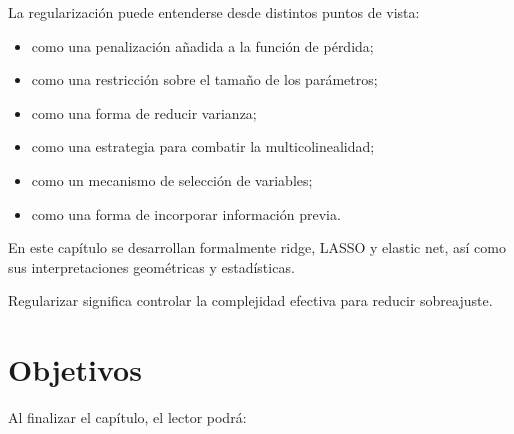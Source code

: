 \documentclass[
  spanish,
  10.5pt,
  letterpaper,
  DIV=11,
  numbers=noendperiod,
  oneside,
  open=any]{scrreprt}
\providecommand{\tightlist}{%
  \setlength{\itemsep}{0pt}\setlength{\parskip}{0pt}}
\theoremstyle{definition}
\theoremstyle{definition}
\theoremstyle{plain}
\theoremstyle{remark}
\begin{document}
La regularización puede entenderse desde distintos puntos de vista:

\begin{itemize}
\tightlist
\item
  como una penalización añadida a la función de pérdida;
\item
  como una restricción sobre el tamaño de los parámetros;
\item
  como una forma de reducir varianza;
\item
  como una estrategia para combatir la multicolinealidad;
\item
  como un mecanismo de selección de variables;
\item
  como una forma de incorporar información previa.
\end{itemize}

En este capítulo se desarrollan formalmente ridge,
LASSO y elastic net, así como sus interpretaciones
geométricas y estadísticas.

\begin{tcolorbox}[enhanced jigsaw, arc=.35mm, bottomrule=.15mm, bottomtitle=1mm, breakable, colback=white, colbacktitle=quarto-callout-important-color!10!white, colframe=quarto-callout-important-color-frame, coltitle=black, left=2mm, leftrule=.75mm, opacityback=0, opacitybacktitle=0.6, rightrule=.15mm, title=\textcolor{quarto-callout-important-color}{\faExclamation}\hspace{0.5em}{Definición esencial}, titlerule=0mm, toprule=.15mm, toptitle=1mm]

Regularizar significa controlar la complejidad efectiva para reducir
sobreajuste.

\end{tcolorbox}

\section*{Objetivos}\label{objetivos-7}


Al finalizar el capítulo, el lector podrá:
\end{document}
